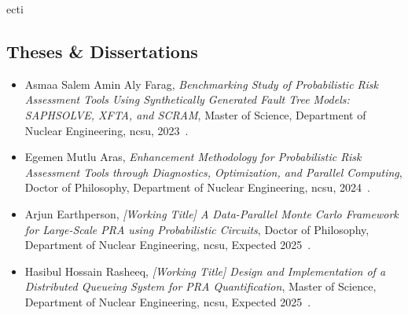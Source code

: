 ecti\subsection{Theses \& Dissertations}
\begin{itemize}
    \item {Asmaa Salem Amin Aly Farag, \textit{Benchmarking Study of Probabilistic Risk Assessment Tools Using Synthetically Generated Fault Tree Models: SAPHSOLVE, XFTA, and SCRAM}, Master of Science, Department of Nuclear Engineering, \acrshort{ncsu}, 2023~\cite{farag_thesis_2023}.}
    \item {Egemen Mutlu Aras, \textit{Enhancement Methodology for Probabilistic Risk Assessment Tools through Diagnostics, Optimization, and Parallel Computing}, Doctor of Philosophy, Department of Nuclear Engineering, \acrshort{ncsu}, 2024~\cite{aras_dissertation_2024}.}
    \item {Arjun Earthperson, \textit{[Working Title] A Data-Parallel Monte Carlo Framework for Large-Scale PRA using Probabilistic Circuits}, Doctor of Philosophy, Department of Nuclear Engineering, \acrshort{ncsu}, Expected 2025~\cite{earthperson_dissertation_2025}.}
    \item {Hasibul Hossain Rasheeq, \textit{[Working Title] Design and Implementation of a Distributed Queueing System for PRA Quantification}, Master of Science, Department of Nuclear Engineering, \acrshort{ncsu}, Expected 2025~\cite{rasheeq_thesis_2025}.}
\end{itemize}